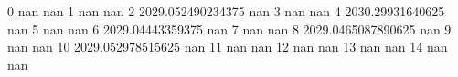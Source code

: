0 nan nan
1 nan nan
2 2029.052490234375 nan
3 nan nan
4 2030.29931640625 nan
5 nan nan
6 2029.04443359375 nan
7 nan nan
8 2029.0465087890625 nan
9 nan nan
10 2029.052978515625 nan
11 nan nan
12 nan nan
13 nan nan
14 nan nan
